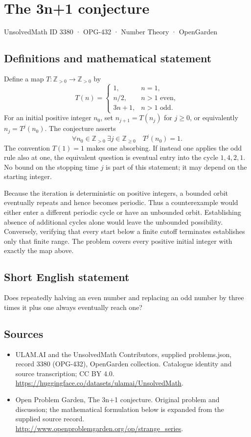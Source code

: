 \documentclass[11pt,a4paper]{article}
\begin{document}
\section*{The 3n+1 conjecture}\label{3380}
{\small UnsolvedMath ID 3380 · OPG-432 · Number Theory · OpenGarden}
\subsection{Definitions and mathematical statement}
Define a map $T:\mathbb Z_{>0}\to\mathbb Z_{>0}$ by
\[
 T(n)=\begin{cases}
 1,&n=1,\\
 n/2,&n>1\text{ even},\\
 3n+1,&n>1\text{ odd}.
 \end{cases}
\]
For an initial positive integer $n_0$, set $n_{j+1}=T(n_j)$ for
$j\ge0$, or equivalently $n_j=T^j(n_0)$. The conjecture asserts
\[
 \forall n_0\in\mathbb Z_{>0}\ \exists j\in\mathbb Z_{\ge0}
                         \quad T^j(n_0)=1.
\]
The convention $T(1)=1$ makes one absorbing. If instead one applies
the odd rule also at one, the equivalent question is eventual entry
into the cycle $1,4,2,1$. No bound on the stopping time $j$ is part
of this statement; it may depend on the starting integer.

Because the iteration is deterministic on positive integers, a
bounded orbit eventually repeats and hence becomes periodic. Thus
a counterexample would either enter a different periodic cycle or
have an unbounded orbit. Establishing absence of additional cycles
alone would leave the unbounded possibility. Conversely, verifying
that every start below a finite cutoff terminates establishes only
that finite range. The problem covers every positive initial integer
with exactly the map above.
\subsection{Short English statement}
Does repeatedly halving an even number and replacing an odd number by three times it plus one always eventually reach one?
\subsection{Sources}
\begin{itemize}
\item[S1] ULAM.AI and the UnsolvedMath Contributors, supplied problems.json, record 3380 (OPG-432), OpenGarden collection. Catalogue identity and source transcription; CC BY 4.0.
\url{https://huggingface.co/datasets/ulamai/UnsolvedMath}.
\item[S2] Open Problem Garden, The 3n+1 conjecture. Original problem and discussion; the mathematical formulation below is expanded from the supplied source record.
\url{http://www.openproblemgarden.org/op/strange_series}.
\end{itemize}
\end{document}
